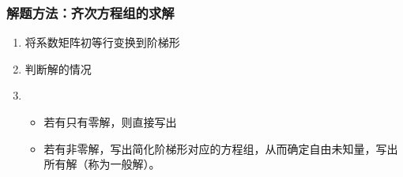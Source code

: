 \documentclass[UTF-8,a4paper]{ctexart}
\begin{document}
\subsubsection{解题方法：齐次方程组的求解}
\begin{enumerate}
    \item 将系数矩阵初等行变换到阶梯形
    \item 判断解的情况
    \item {\begin{itemize}
        \item 若有只有零解，则直接写出
        \item 若有非零解，写出简化阶梯形对应的方程组，从而确定自由未知量，写出所有解（称为一般解）。
        \end{itemize}}
\end{enumerate}
\end{document}
